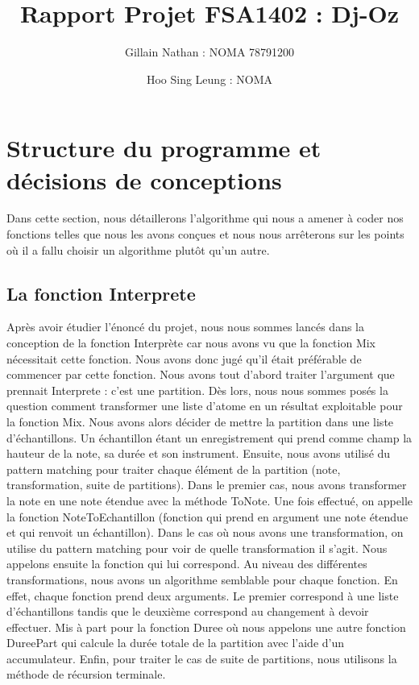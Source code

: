 \documentclass[a4paper,12pt]{article}
\title{Rapport Projet FSA1402 : Dj-Oz}
\author{Gillain Nathan : NOMA 78791200 \and Hoo Sing Leung : NOMA }
\begin{document}
\maketitle
\tableofcontents


\section{Structure du programme et décisions de conceptions}

Dans cette section, nous détaillerons l'algorithme qui nous a amener à coder nos fonctions telles que nous les avons conçues
et nous nous arrêterons sur les points où il a fallu choisir un algorithme plutôt qu'un autre.

\subsection{La fonction Interprete}

Après avoir étudier l'énoncé du projet, nous nous sommes lancés dans la conception de la fonction Interprète car nous avons vu
que la fonction Mix nécessitait cette fonction. Nous avons donc jugé qu'il était préférable de commencer par cette fonction.
Nous avons tout d'abord traiter l'argument que prennait Interprete : c'est une partition. Dès lors, nous nous sommes posés la 
question comment transformer une liste d'atome en un résultat exploitable pour la fonction Mix. Nous avons alors décider 
de mettre la partition dans une liste d'échantillons. Un échantillon étant un enregistrement qui prend comme champ la hauteur
de la note, sa durée et son instrument. Ensuite, nous avons utilisé du pattern matching pour traiter chaque élément de la 
partition (note, transformation, suite de partitions). 
Dans le premier cas, nous avons transformer la note en une note étendue avec la méthode ToNote. Une fois effectué, on appelle 
la fonction NoteToEchantillon (fonction qui prend en argument une note étendue et qui renvoit un échantillon).
Dans le cas où nous avons une transformation, on utilise du pattern matching pour voir de quelle transformation il s'agit. 
Nous appelons ensuite la fonction qui lui correspond. Au niveau des différentes transformations, nous avons un algorithme 
semblable pour chaque fonction. En effet, chaque fonction prend deux arguments. Le premier correspond à une liste 
d'échantillons tandis que le deuxième correspond au changement à devoir effectuer. Mis à part pour la fonction Duree où nous 
appelons une autre fonction DureePart qui calcule la durée totale de la partition avec l'aide d'un accumulateur.
Enfin, pour traiter le cas de suite de partitions, nous utilisons la méthode de récursion terminale.
\end{document}
